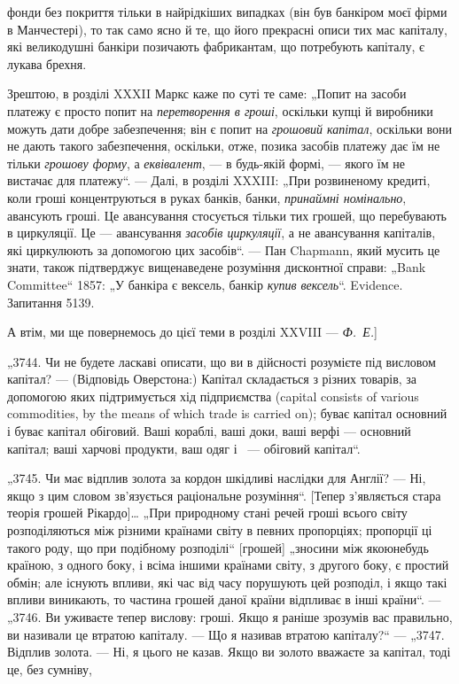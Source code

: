 \parcont{}  %
фонди без покриття тільки в найрідкіших випадках (він був
банкіром моєї фірми в Манчестері), то так само ясно й те, що
його прекрасні описи тих мас капіталу, які великодушні банкіри
позичають фабрикантам, що потребують капіталу, є лукава
брехня.

Зрештою, в розділі XXXII Маркс каже по суті те саме:
„Попит на засоби платежу є просто попит на \emph{перетворення в
гроші}, оскільки купці й виробники можуть дати добре забезпечення; він є попит на \emph{грошовий капітал},
оскільки вони не
дають такого забезпечення, оскільки, отже, позика засобів платежу дає їм не тільки \emph{грошову форму}, а
\emph{еквівалент}, — в будь-якій формі, — якого їм не вистачає для платежу“. — Далі,
в розділі XXXIII: „При розвиненому кредиті, коли гроші концентруються в руках банків, банки,
\emph{принаймні номінально}, авансують гроші. Це авансування стосується тільки тих грошей,
що перебувають
в циркуляції. Це — авансування \emph{засобів
циркуляції}, а не авансування капіталів, які циркулюють за допомогою цих засобів“. — Пан Chapmann,
який мусить це знати,
також підтверджує вищенаведене розуміння дисконтної справи:
„Bank Committee“ 1857: „У банкіра є вексель, банкір \emph{купив вексель}“. Evidence. Запитання 5139.

А втім, ми ще повернемось до цієї теми в розділі
XXVIII — \emph{Ф.~Е.}]

„3744. Чи не будете ласкаві описати, що ви в дійсності розумієте під висловом капітал? — (Відповідь
Оверстона:) Капітал
складається з різних товарів, за допомогою яких підтримується
хід підприємства (capital consists of various commodities, by the
means of which trade is carried on); буває капітал основний і буває капітал обіговий. Ваші кораблі,
ваші доки, ваші верфі —
основний капітал; ваші харчові продукти, ваш одяг і~ — обіговий капітал“.

„3745. Чи має відплив золота за кордон шкідливі наслідки для
Англії? — Ні, якщо з цим словом зв’язується раціональне розуміння“. [Тепер з’являється стара теорія
грошей Рікардо]\dots{} „При
природному стані речей гроші всього світу розподіляються між
різними країнами світу в певних пропорціях; пропорції ці такого
роду, що при подібному розподілі“ [грошей] „зносини між якоюнебудь країною, з одного боку, і всіма
іншими країнами світу, з другого боку, є простий обмін; але існують впливи, які час
від часу порушують цей розподіл, і якщо такі впливи виникають,
то частина грошей даної країни відпливає в інші країни“. — „3746.
Ви уживаєте тепер вислову: гроші. Якщо я раніше зрозумів вас
правильно, ви називали це втратою капіталу. — Що я називав
втратою капіталу?“ — „3747. Відплив золота. — Ні, я цього не
казав. Якщо ви золото вважаєте за капітал, тоді це, без сумніву,
\parbreak{}  %
